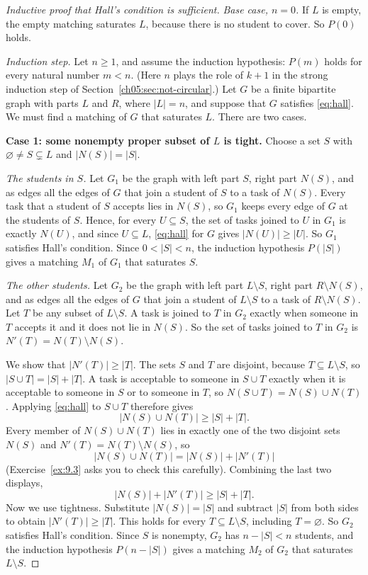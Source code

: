 \begin{proof}[Inductive proof that Hall's condition is sufficient]
\emph{Base case, $n=0$.} If $L$ is empty, the empty matching saturates $L$, because there is no student to cover. So $P(0)$ holds.

\emph{Induction step.} Let $n\ge1$, and assume the induction hypothesis: $P(m)$ holds for every natural number $m<n$. (Here $n$ plays the role of $k+1$ in the strong induction step of Section~\ref{ch05:sec:not-circular}.) Let $G$ be a finite bipartite graph with parts $L$ and $R$, where $|L|=n$, and suppose that $G$ satisfies \eqref{eq:hall}. We must find a matching of $G$ that saturates $L$. There are two cases.

\textbf{Case 1: some nonempty proper subset of $L$ is tight.} Choose a set $S$ with $\varnothing\ne S\subsetneq L$ and $|N(S)|=|S|$.

\emph{The students in $S$.} Let $G_1$ be the graph with left part $S$, right part $N(S)$, and as edges all the edges of $G$ that join a student of $S$ to a task of $N(S)$. Every task that a student of $S$ accepts lies in $N(S)$, so $G_1$ keeps every edge of $G$ at the students of $S$. Hence, for every $U\subseteq S$, the set of tasks joined to $U$ in $G_1$ is exactly $N(U)$, and since $U\subseteq L$, \eqref{eq:hall} for $G$ gives $|N(U)|\ge|U|$. So $G_1$ satisfies Hall's condition. Since $0<|S|<n$, the induction hypothesis $P(|S|)$ gives a matching $M_1$ of $G_1$ that saturates $S$.

\emph{The other students.} Let $G_2$ be the graph with left part $L\setminus S$, right part $R\setminus N(S)$, and as edges all the edges of $G$ that join a student of $L\setminus S$ to a task of $R\setminus N(S)$. Let $T$ be any subset of $L\setminus S$. A task is joined to $T$ in $G_2$ exactly when someone in $T$ accepts it and it does not lie in $N(S)$. So the set of tasks joined to $T$ in $G_2$ is $N'(T)=N(T)\setminus N(S)$.

We show that $|N'(T)|\ge|T|$. The sets $S$ and $T$ are disjoint, because $T\subseteq L\setminus S$, so $|S\cup T|=|S|+|T|$. A task is acceptable to someone in $S\cup T$ exactly when it is acceptable to someone in $S$ or to someone in $T$, so $N(S\cup T)=N(S)\cup N(T)$. Applying \eqref{eq:hall} to $S\cup T$ therefore gives
\[
|N(S)\cup N(T)|\ge |S|+|T|.
\]
Every member of $N(S)\cup N(T)$ lies in exactly one of the two disjoint sets $N(S)$ and $N'(T)=N(T)\setminus N(S)$, so
\[
|N(S)\cup N(T)|=|N(S)|+|N'(T)|
\]
(Exercise~\ref{ex:9.3} asks you to check this carefully). Combining the last two displays,
\[
|N(S)|+|N'(T)|\ge |S|+|T|.
\]
Now we use tightness. Substitute $|N(S)|=|S|$ and subtract $|S|$ from both sides to obtain $|N'(T)|\ge|T|$. This holds for every $T\subseteq L\setminus S$, including $T=\varnothing$. So $G_2$ satisfies Hall's condition. Since $S$ is nonempty, $G_2$ has $n-|S|<n$ students, and the induction hypothesis $P(n-|S|)$ gives a matching $M_2$ of $G_2$ that saturates $L\setminus S$.


\end{proof}
